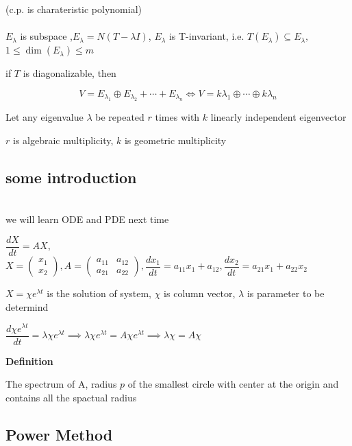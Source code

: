 (c.p. is charateristic polynomial)\\ \\

$E_{\lambda}$ is subspace ,$E_{\lambda} = N(T-\lambda I)$, $E_{\lambda}$ is T-invariant, i.e. $T(E_{\lambda}) \subseteq E_{\lambda},$$ 1 \leq \dim(E_\lambda) \leq m$ 

if $T$ is diagonalizable, then

$$V = E_{\lambda_1}\oplus E_{\lambda_2}+\cdots + E_{\lambda_n} \Leftrightarrow V = k\lambda_1 \oplus \cdots \oplus k \lambda_n$$

Let any eigenvalue $\lambda$ be repeated $r$ times with $k$ linearly independent eigenvector

$r$ is algebraic multiplicity, $k$ is geometric multiplicity

\newpage

\subsection{some introduction}$ $\\

we will learn ODE and PDE next time

$\dfrac{dX}{dt} = AX$, $X = \left( \begin{matrix}x_1\\x_2 \end{matrix}\right), A = \left( \begin{matrix} a_{11} & a_{12} \\ a_{21} & a_{22}\end{matrix}\right) ,\dfrac{dx_1}{dt} = a_{11}x_1 + a_{12},\dfrac{dx_2}{dt} = a_{21}x_1 + a_{22}x_2$

$X = \chi e^{\lambda t}$ is the solution of system, $\chi$ is column vector, $\lambda$ is parameter to be determind

$\dfrac{d \chi e^{\lambda t}}{dt} = \lambda \chi e^{\lambda t} \implies \lambda \chi e^{\lambda t} = A \chi e ^{\lambda t} \implies \lambda \chi = A\chi$

\textbf{Definition}

\begin{tcolorbox}
	The spectrum of A, radius $p$ of the smallest circle with center at the origin and contains all the spactual radius
\end{tcolorbox}

\subsection{Power Method} $ $\\

